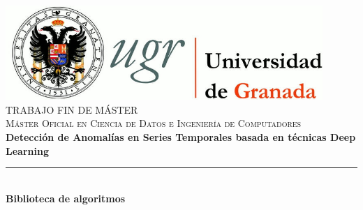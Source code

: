 \begin{titlepage}
 
 
\newlength{\centeroffset}
\setlength{\centeroffset}{-0.5\oddsidemargin}
\addtolength{\centeroffset}{0.5\evensidemargin}
\thispagestyle{empty}

\noindent\hspace*{\centeroffset}\begin{minipage}{\textwidth}

\centering
\includegraphics[width=0.9\textwidth]{imagenes/logos/logo_ugr.jpg}\\[1.4cm]

\textsc{ \Large TRABAJO FIN DE MÁSTER\\[0.2cm]}
\textsc{ Máster Oficial en Ciencia de Datos e Ingeniería de Computadores}\\[1cm]
% 
{\Huge\bfseries Detección de Anomalías en Series Temporales basada en técnicas Deep Learning\\
}
\noindent\rule[-1ex]{\textwidth}{3pt}\\[3.5ex]
{\large\bfseries Biblioteca de algoritmos}
\end{minipage}

\vspace{2.5cm}
\noindent\hspace*{\centeroffset}\begin{minipage}{\textwidth}
\centering


\end{minipage}
\end{titlepage}
